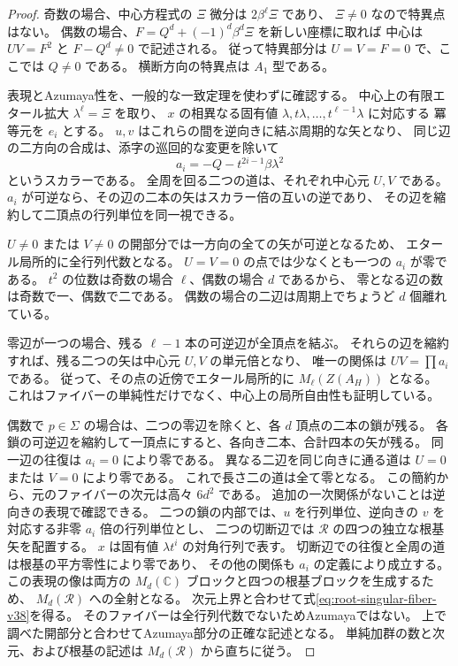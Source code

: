 \begin{proof}
奇数の場合、中心方程式の $\Xi$ 微分は $2\beta^\ell\Xi$ であり、
$\Xi\ne0$ なので特異点はない。
偶数の場合、$F=Q^d+(-1)^d\beta^d\Xi$ を新しい座標に取れば
中心は $UV=F^2$ と $F-Q^d\ne0$ で記述される。
従って特異部分は $U=V=F=0$ で、ここでは $Q\ne0$ である。
横断方向の特異点は $A_1$ 型である。

表現とAzumaya性を、一般的な一致定理を使わずに確認する。
中心上の有限エタール拡大 $\lambda^\ell=\Xi$ を取り、
$x$ の相異なる固有値 $\lambda,t\lambda,\ldots,t^{\ell-1}\lambda$ に対応する
冪等元を $e_i$ とする。
$u,v$ はこれらの間を逆向きに結ぶ周期的な矢となり、
同じ辺の二方向の合成は、添字の巡回的な変更を除いて
\[
 a_i=-Q-t^{2i-1}\beta\lambda^2
\]
というスカラーである。
全周を回る二つの道は、それぞれ中心元 $U,V$ である。
$a_i$ が可逆なら、その辺の二本の矢はスカラー倍の互いの逆であり、
その辺を縮約して二頂点の行列単位を同一視できる。

$U\ne0$ または $V\ne0$ の開部分では一方向の全ての矢が可逆となるため、
エタール局所的に全行列代数となる。
$U=V=0$ の点では少なくとも一つの $a_i$ が零である。
$t^2$ の位数は奇数の場合 $\ell$、偶数の場合 $d$ であるから、
零となる辺の数は奇数で一、偶数で二である。
偶数の場合の二辺は周期上でちょうど $d$ 個離れている。

零辺が一つの場合、残る $\ell-1$ 本の可逆辺が全頂点を結ぶ。
それらの辺を縮約すれば、残る二つの矢は中心元 $U,V$ の単元倍となり、
唯一の関係は $UV=\prod a_i$ である。
従って、その点の近傍でエタール局所的に
$M_\ell(Z(A_H))$ となる。
これはファイバーの単純性だけでなく、中心上の局所自由性も証明している。

偶数で $p\in\Sigma$ の場合は、二つの零辺を除くと、各 $d$ 頂点の二本の鎖が残る。
各鎖の可逆辺を縮約して一頂点にすると、各向き二本、合計四本の矢が残る。
同一辺の往復は $a_i=0$ により零である。
異なる二辺を同じ向きに通る道は $U=0$ または $V=0$ により零である。
これで長さ二の道は全て零となる。
この簡約から、元のファイバーの次元は高々 $6d^2$ である。
追加の一次関係がないことは逆向きの表現で確認できる。
二つの鎖の内部では、$u$ を行列単位、逆向きの $v$ を対応する非零 $a_i$ 倍の行列単位とし、
二つの切断辺では $\mathcal R$ の四つの独立な根基矢を配置する。
$x$ は固有値 $\lambda t^i$ の対角行列で表す。
切断辺での往復と全周の道は根基の平方零性により零であり、
その他の関係も $a_i$ の定義により成立する。
この表現の像は両方の $M_d(\mathbb C)$ ブロックと四つの根基ブロックを生成するため、
$M_d(\mathcal R)$ への全射となる。
次元上界と合わせて式\eqref{eq:root-singular-fiber-v38}を得る。
そのファイバーは全行列代数でないためAzumayaではない。
上で調べた開部分と合わせてAzumaya部分の正確な記述となる。
単純加群の数と次元、および根基の記述は $M_d(\mathcal R)$ から直ちに従う。
\end{proof}

